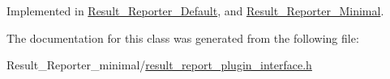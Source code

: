 Implemented in \hyperlink{classResult__Reporter__Default_a0cd7068847fcea1f0f4a6ba82441c4c6}{Result\+\_\+\+Reporter\+\_\+\+Default}, and \hyperlink{classResult__Reporter__Minimal_af40ff386283122012cf55bf9c415fa71}{Result\+\_\+\+Reporter\+\_\+\+Minimal}.



The documentation for this class was generated from the following file\+:\begin{DoxyCompactItemize}
\item 
Result\+\_\+\+Reporter\+\_\+minimal/\hyperlink{Result__Reporter__minimal_2result__report__plugin__interface_8h}{result\+\_\+report\+\_\+plugin\+\_\+interface.\+h}\end{DoxyCompactItemize}
